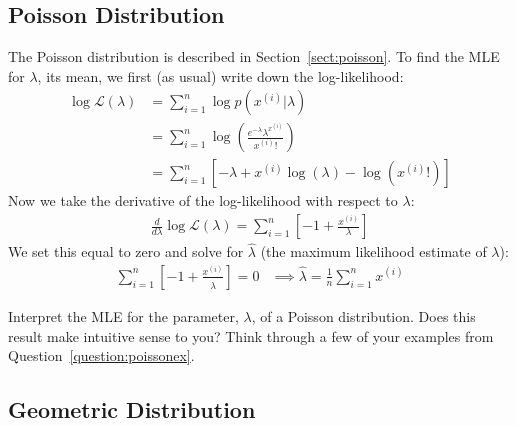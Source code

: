 \subsection{Poisson Distribution}

The Poisson distribution is described in Section~\ref{sect:poisson}. To find the MLE for $\lambda$, its mean, we first (as usual) write down the log-likelihood:
\begin{align*}
\log \mathcal{L}(\lambda) &= \sum_{i=1}^n \log p(x^{(i)}|\lambda) \\
&= \sum_{i=1}^n \log \left( \frac{e^{-\lambda} \lambda^{x^{(i)}}}{x^{(i)}!} \right) \\
&= \sum_{i=1}^n \left[ -\lambda + x^{(i)} \log(\lambda) - \log(x^{(i)}!) \right] \end{align*}
Now we take the derivative of the log-likelihood with respect to $\lambda$:
\begin{align*}
\frac{d}{d \lambda} \log \mathcal{L}(\lambda) = \sum_{i=1}^n \left[ -1 + \frac{x^{(i)}}{\lambda} \right]
\end{align*}
We set this equal to zero and solve for $\hat{\lambda}$ (the maximum likelihood estimate of $\lambda$):
\begin{align*} \sum_{i=1}^n \left[ -1 + \frac{x^{(i)}}{\hat{\lambda}} \right] = 0 & \implies \boxed{\hat{\lambda} = \frac{1}{n} \sum_{i=1}^n x^{(i)}} \end{align*}

\begin{question}{}
Interpret the MLE for the parameter, $\lambda$, of a Poisson distribution. Does this result make intuitive sense to you? Think through a few of your examples from Question~\ref{question:poissonex}. 
\end{question}

\subsection{Geometric Distribution}

